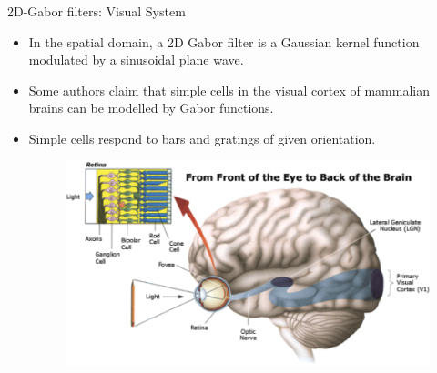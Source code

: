\begin{frame}{2D-Gabor filters: Visual System}
\begin{itemize}
\item In the spatial domain, a 2D Gabor filter is a Gaussian kernel function modulated by a sinusoidal plane wave. 
\item Some authors claim that simple cells in the visual cortex of mammalian brains can be modelled by Gabor functions.
\item Simple cells respond to bars and gratings of given
orientation.
\begin{figure}
\includegraphics[scale=0.52]{Figures/visualSystem.png}
\end{figure}
\end{itemize}
\end{frame}

